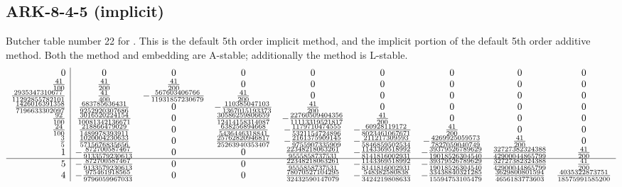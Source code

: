 \documentclass[letterpaper,10pt,english]{sphinxmanual}
\begin{document}
\subsection{ARK-8-4-5 (implicit)}
\label{Butcher:ark-8-4-5-implicit}\label{Butcher:butcher-ark-8-4-5-i}
Butcher table number 22
for {\hyperref[c_interface/User_callable:ARKodeSetIRKTableNum]{}}.  This is
the default 5th order implicit method, and the implicit portion of the
default 5th order additive method.  Both the method and embedding are
A-stable; additionally the method is L-stable.
\begin{gather}
\begin{split}\begin{array}{r|cccccccc}
  0 & 0 & 0 & 0 & 0 & 0 & 0 & 0 & 0 \\
  \frac{41}{100} & \frac{41}{200} & \frac{41}{200} & 0 & 0 & 0 & 0 & 0 & 0 \\
  \frac{2935347310677}{11292855782101} & \frac{41}{400} & -\frac{567603406766}{11931857230679} & \frac{41}{200} & 0 & 0 & 0 & 0 & 0 \\
  \frac{1426016391358}{7196633302097} & \frac{683785636431}{9252920307686} & 0 & -\frac{110385047103}{1367015193373} & \frac{41}{200} & 0 & 0 & 0 & 0 \\
  \frac{92}{100} & \frac{3016520224154}{10081342136671} & 0 & \frac{30586259806659}{12414158314087} & -\frac{22760509404356}{11113319521817} & \frac{41}{200} & 0 & 0 & 0 \\
  \frac{24}{100} & \frac{218866479029}{1489978393911} & 0 & \frac{638256894668}{5436446318841} & -\frac{1179710474555}{5321154724896} & -\frac{60928119172}{8023461067671} & \frac{41}{200} & 0 & 0 \\
  \frac{3}{5} & \frac{1020004230633}{5715676835656} & 0 & \frac{25762820946817}{25263940353407} & -\frac{2161375909145}{9755907335909} & -\frac{211217309593}{5846859502534} & -\frac{4269925059573}{7827059040749} & \frac{41}{200} & 0 \\
  1 & -\frac{872700587467}{9133579230613} & 0 & 0 & \frac{22348218063261}{9555858737531} & -\frac{1143369518992}{8141816002931} & -\frac{39379526789629}{19018526304540} & \frac{32727382324388}{42900044865799} & \frac{41}{200} \\
  \hline
  5 & -\frac{872700587467}{9133579230613} & 0 & 0 & \frac{22348218063261}{9555858737531} & -\frac{1143369518992}{8141816002931} & -\frac{39379526789629}{19018526304540} & \frac{32727382324388}{42900044865799} & \frac{41}{200} \\
  4 & -\frac{975461918565}{9796059967033} & 0 & 0 & \frac{78070527104295}{32432590147079} & -\frac{548382580838}{3424219808633} & -\frac{33438840321285}{15594753105479} & \frac{3629800801594}{4656183773603} & \frac{4035322873751}{18575991585200}
\end{array}\end{split}\notag
\end{gather}\begin{figure}[htbp]
\centering
\capstart


\end{figure}
\end{document}
